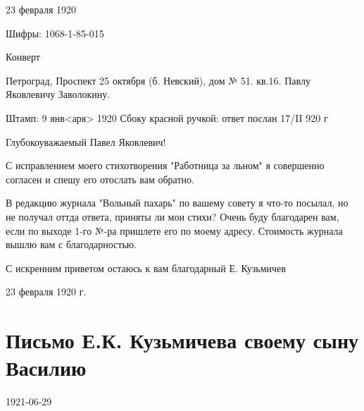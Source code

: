 \documentclass[]{memoir}
\begin{document}
23 февраля 1920

Шифры:  1068-1-85-015

Конверт

Петроград, Проспект 25 октября (б. Невский), дом № 51. кв.16. Павлу Яковлевичу Заволокину.

Штамп: 9 янв<аря> 1920
Сбоку красной ручкой: ответ послан 17/II 920 г


Глубокоуважаемый Павел Яковлевич!

С исправлением моего стихотворения "Работница за льном" я совершенно согласен и спешу его отослать вам обратно.

В редакцию журнала "Вольный пахарь" по вашему совету я что-то посылал, но не получал оттда ответа, приняты ли мои стихи? Очень буду благодарен вам, если по выходе 1-го №-ра пришлете его по моему адресу. Стоимость журнала вышлю вам с благодарностью.

С искренним приветом остаюсь к вам благодарный Е. Кузьмичев


23 февраля 1920 г.







\section{Письмо Е.К. Кузьмичева своему сыну Василию}

1921-06-29
\end{document}
